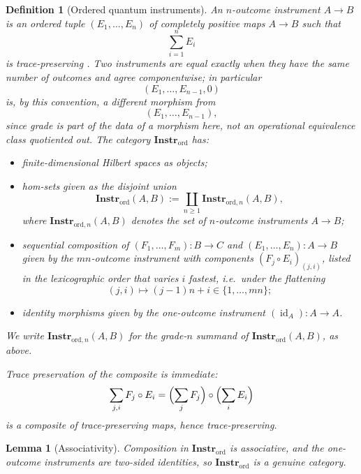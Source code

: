 \documentclass[11pt]{article}
\newtheorem{lemma}[theorem]{Lemma}
\newtheorem{definition}[theorem]{Definition}
\DeclareMathOperator{\id}{id}
\begin{document}
\begin{definition}[Ordered quantum instruments]
\label{def:ordered-instruments}
An $n$-outcome instrument $A\to B$ is an ordered tuple
$(E_1,\dots,E_n)$ of completely positive maps $A\to B$ such that
\[
\sum_{i=1}^n E_i
\]
is trace-preserving \cite{DaviesLewis1970, Ozawa1984}. Two instruments are
equal exactly when they have the same number of outcomes and agree
componentwise; in particular
\[
(E_1,\dots,E_{n-1},0)
\]
is, by this convention, a different morphism from
\[
(E_1,\dots,E_{n-1}),
\]
since grade is part of the data of a morphism here, not an operational
equivalence class quotiented out. The category
$\mathbf{Instr}_{\mathrm{ord}}$ has:
\begin{itemize}
\item finite-dimensional Hilbert spaces as objects;
\item hom-sets given as the disjoint union
\[
\mathbf{Instr}_{\mathrm{ord}}(A,B)
:=
\coprod_{n\ge1}
\mathbf{Instr}_{\mathrm{ord},n}(A,B),
\]
where $\mathbf{Instr}_{\mathrm{ord},n}(A,B)$ denotes the set of $n$-outcome
instruments $A\to B$;
\item sequential composition of $(F_1,\dots,F_m):B\to C$ and
$(E_1,\dots,E_n):A\to B$ given by the $mn$-outcome instrument with
components $(F_j\circ E_i)_{(j,i)}$, listed in the lexicographic order that
varies $i$ fastest, i.e.\ under the flattening
\[
(j,i)\longmapsto (j-1)n+i\in\{1,\dots,mn\};
\]
\item identity morphisms given by the one-outcome instrument
$(\id_A):A\to A$.
\end{itemize}
We write $\mathbf{Instr}_{\mathrm{ord},n}(A,B)$ for the grade-$n$ summand
of $\mathbf{Instr}_{\mathrm{ord}}(A,B)$, as above.

Trace preservation of the composite is immediate:
\[
\sum_{j,i}F_j\circ E_i
=
\Bigl(\sum_j F_j\Bigr)\circ\Bigl(\sum_i E_i\Bigr)
\]
is a composite of trace-preserving maps, hence trace-preserving.
\end{definition}

\begin{lemma}[Associativity]
\label{lem:instr-associativity}
Composition in $\mathbf{Instr}_{\mathrm{ord}}$ is associative, and the
one-outcome instruments are two-sided identities, so
$\mathbf{Instr}_{\mathrm{ord}}$ is a genuine category.
\end{lemma}
\end{document}
